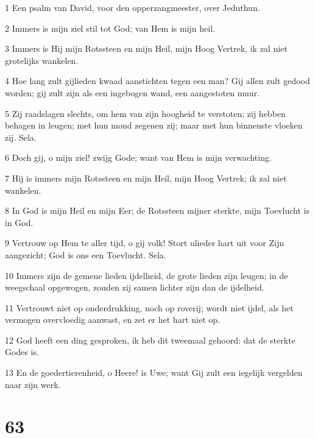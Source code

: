 \par 1 Een psalm van David, voor den opperzangmeester, over Jeduthun.
\par 2 Immers is mijn ziel stil tot God; van Hem is mijn heil.
\par 3 Immers is Hij mijn Rotssteen en mijn Heil, mijn Hoog Vertrek, ik zal niet grotelijks wankelen.
\par 4 Hoe lang zult gijlieden kwaad aanstichten tegen een man? Gij allen zult gedood worden; gij zult zijn als een ingebogen wand, een aangestoten muur.
\par 5 Zij raadslagen slechts, om hem van zijn hoogheid te verstoten; zij hebben behagen in leugen; met hun mond zegenen zij; maar met hun binnenste vloeken zij. Sela.
\par 6 Doch gij, o mijn ziel! zwijg Gode; want van Hem is mijn verwachting.
\par 7 Hij is immers mijn Rotssteen en mijn Heil, mijn Hoog Vertrek; ik zal niet wankelen.
\par 8 In God is mijn Heil en mijn Eer; de Rotssteen mijner sterkte, mijn Toevlucht is in God.
\par 9 Vertrouw op Hem te aller tijd, o gij volk! Stort ulieder hart uit voor Zijn aangezicht; God is ons een Toevlucht. Sela.
\par 10 Immers zijn de gemene lieden ijdelheid, de grote lieden zijn leugen; in de weegschaal opgewogen, zouden zij samen lichter zijn dan de ijdelheid.
\par 11 Vertrouwt niet op onderdrukking, noch op roverij; wordt niet ijdel, als het vermogen overvloedig aanwast, en zet er het hart niet op.
\par 12 God heeft een ding gesproken, ik heb dit tweemaal gehoord: dat de sterkte Godes is.
\par 13 En de goedertierenheid, o Heere! is Uwe; want Gij zult een iegelijk vergelden naar zijn werk.

\chapter{63}

